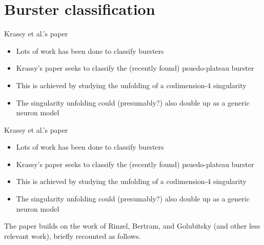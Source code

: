 \documentclass{beamer}
\begin{document}
\section{Burster classification}
\label{sec:org5a7c26c}
\begin{frame}[label={sec:org8688d53}]{Krassy et al.'s paper}
\begin{itemize}
\item Lots of work has been done to classify bursters
\item Krassy's paper seeks to classify the (recently found) psuedo-plateau burster
\item This is achieved by studying the unfolding of a codimension-4 singularity
\item The singularity unfolding could (presumably?) also double up as a generic neuron model
\end{itemize}
\end{frame}

\begin{frame}[label={sec:org3bc2c62}]{Krassy et al.'s paper}
\begin{itemize}
\item Lots of work has been done to classify bursters
\item Krassy's paper seeks to classify the (recently found) psuedo-plateau burster
\item This is achieved by studying the unfolding of a codimension-4 singularity
\item The singularity unfolding could (presumably?) also double up as a generic neuron model
\end{itemize}


The paper builds on the work of Rinzel, Bertram, and Golubitsky (and other less relevant work), briefly recounted as follows.
\end{frame}
\end{document}
